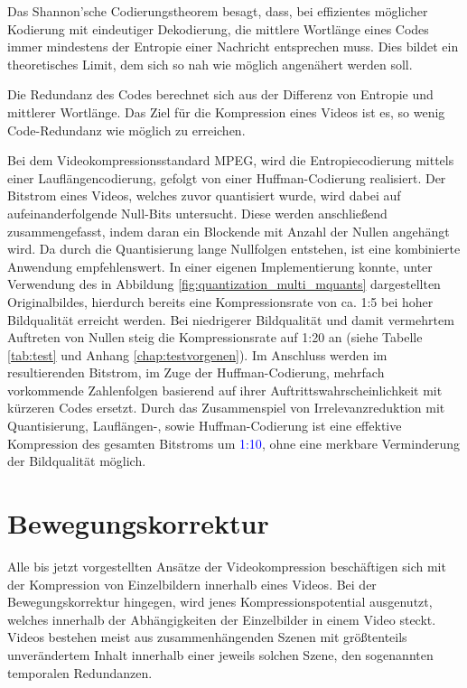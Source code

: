 Das Shannon'sche Codierungstheorem besagt, dass, bei effizientes möglicher Kodierung mit eindeutiger Dekodierung, die mittlere Wortlänge eines Codes immer mindestens der Entropie einer Nachricht entsprechen muss. Dies bildet ein theoretisches Limit, dem sich so nah wie möglich angenähert werden soll.

Die Redundanz des Codes berechnet sich aus der Differenz von Entropie und mittlerer Wortlänge. Das Ziel für die Kompression eines Videos ist es, so wenig Code-Redundanz wie möglich zu erreichen.

Bei dem Videokompressionsstandard MPEG, wird die Entropiecodierung mittels einer Lauflängencodierung, gefolgt von einer Huffman-Codierung realisiert. Der Bitstrom eines Videos, welches zuvor quantisiert wurde, wird dabei auf aufeinanderfolgende Null-Bits untersucht. Diese werden anschließend zusammengefasst, indem daran ein Blockende mit Anzahl der Nullen angehängt wird.
Da durch die Quantisierung lange Nullfolgen entstehen, ist eine kombinierte Anwendung empfehlenswert.
In einer eigenen Implementierung konnte, unter Verwendung des in Abbildung \ref{fig:quantization_multi_mquants} dargestellten Originalbildes, hierdurch bereits eine Kompressionsrate von ca. 1:5 bei hoher Bildqualität erreicht werden. Bei niedrigerer Bildqualität und damit vermehrtem Auftreten von Nullen steig die Kompressionsrate auf 1:20 an (siehe Tabelle \ref{tab:test} und Anhang \ref{chap:testvorgenen}).
Im Anschluss werden im resultierenden Bitstrom, im Zuge der Huffman-Codierung, mehrfach vorkommende Zahlenfolgen basierend auf ihrer Auftrittswahrscheinlichkeit mit kürzeren Codes ersetzt.
Durch das Zusammenspiel von Irrelevanzreduktion mit Quantisierung, Lauflängen-, sowie Huffman-Codierung ist eine effektive Kompression des gesamten Bitstroms um \textcolor{blue}{1:10}, ohne eine merkbare Verminderung der Bildqualität möglich.

\section{Bewegungskorrektur}
Alle bis jetzt vorgestellten Ansätze der Videokompression beschäftigen sich mit der Kompression von Einzelbildern innerhalb eines Videos. Bei der Bewegungskorrektur hingegen, wird jenes Kompressionspotential ausgenutzt, welches innerhalb der Abhängigkeiten der Einzelbilder in einem Video steckt.
Videos bestehen meist aus zusammenhängenden Szenen mit größtenteils unverändertem Inhalt innerhalb einer jeweils solchen Szene, den sogenannten temporalen Redundanzen.

